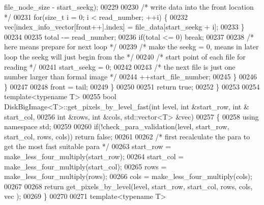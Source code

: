 \begin{DoxyCode}
      file\_node\_size - start\_seekg);
00229 
00230                                 \textcolor{comment}{/* write data into the front location */}
00231                                 \textcolor{keywordflow}{for}(\textcolor{keywordtype}{size\_t} i = 0; i < read\_number; ++i) \{
00232                                         vec[index\_info\_vector[front++].index] =
       file\_data[start\_seekg + i];
00233                                 \}
00234 
00235                                 total -= read\_number;
00236                                 \textcolor{keywordflow}{if}(total <= 0)  \textcolor{keywordflow}{break};
00237 
00238                                 \textcolor{comment}{/* here means prepare for next loop */}
00239                                 \textcolor{comment}{/* make the seekg = 0, means in later loop the
       seekg will just begin from the */}
00240                                 \textcolor{comment}{/* start point of each file for reading */}
00241                                 start\_seekg = 0;
00242 
00243                                 \textcolor{comment}{/* the next file is just one number larger than
       formal image */}
00244                                 ++start\_file\_number;
00245                         \}
00246                 \}
00247 
00248                 front = tail;
00249         \}
00250 
00251         \textcolor{keywordflow}{return} \textcolor{keyword}{true};
00252 \}
00253 
00254 \textcolor{keyword}{template}<\textcolor{keyword}{typename} T>
00255 \textcolor{keywordtype}{bool} DiskBigImage<T>::get_pixels_by_level_fast(\textcolor{keywordtype}{int} level, \textcolor{keywordtype}{int} &start\_row, \textcolor{keywordtype}{int} &
      start\_col,
00256         \textcolor{keywordtype}{int} &rows, \textcolor{keywordtype}{int} &cols, std::vector<T> &vec)
00257 \{
00258         \textcolor{keyword}{using namespace }std;
00259 
00260         \textcolor{keywordflow}{if}(!check\_para\_validation(level, start\_row, start\_col, rows, cols)) \textcolor{keywordflow}{
      return} \textcolor{keyword}{false};
00261 
00262         \textcolor{comment}{/* first recalculate the para to get the most fast suitable para */}
00263         start\_row = make\_less\_four\_multiply(start\_row);
00264         start\_col = make\_less\_four\_multiply(start\_col);
00265         rows = make\_less\_four\_multiply(rows);
00266         cols = make\_less\_four\_multiply(cols);
00267 
00268         \textcolor{keywordflow}{return} get\_pixels\_by\_level(level, start\_row, start\_col, rows, cols, vec
      );
00269 \}
00270 
00271 \textcolor{keyword}{template}<\textcolor{keyword}{typename} T>

\end{DoxyCode}
